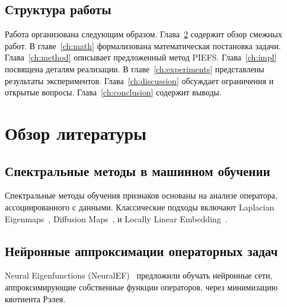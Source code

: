 \documentclass[14pt, a4paper, oneside]{extreport}
\theoremstyle{plain}
\theoremstyle{definition}
\begin{document}

\section{Структура работы}

Работа организована следующим образом.
Глава~\ref{ch:related} содержит обзор смежных работ.
В главе~\ref{ch:math} формализована математическая постановка задачи.
Глава~\ref{ch:method} описывает предложенный метод PIEFS.
Глава~\ref{ch:impl} посвящена деталям реализации.
В главе~\ref{ch:experiments} представлены результаты экспериментов.
Глава~\ref{ch:discussion} обсуждает ограничения и открытые вопросы.
Глава~\ref{ch:conclusion} содержит выводы.

\chapter{Обзор литературы}
\label{ch:related}

\section{Спектральные методы в машинном обучении}

Спектральные методы обучения признаков основаны на анализе оператора, ассоциированного с данными.
Классические подходы включают Laplacian Eigenmaps~\cite{Belkin2003}, Diffusion Maps~\cite{Coifman2006}, и Locally Linear Embedding~\cite{Roweis2000}.


\section{Нейронные аппроксимации операторных задач}

Neural Eigenfunctions (NeuralEF)~\cite{pmlr-v162-deng22b} предложили обучать нейронные сети, аппроксимирующие собственные функции операторов, через минимизацию квотиента Рэлея.
\end{document}
